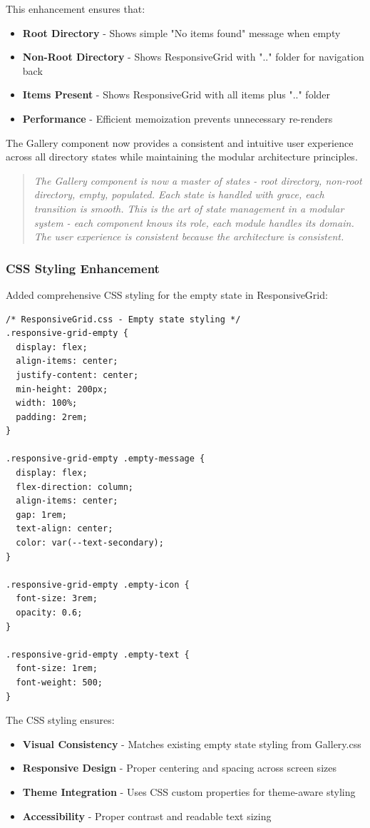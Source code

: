 \documentclass[11pt]{article}
\begin{document}
This enhancement ensures that:
\begin{itemize}
\item \textbf{Root Directory} - Shows simple "No items found" message when empty
\item \textbf{Non-Root Directory} - Shows ResponsiveGrid with ".." folder for navigation back
\item \textbf{Items Present} - Shows ResponsiveGrid with all items plus ".." folder
\item \textbf{Performance} - Efficient memoization prevents unnecessary re-renders
\end{itemize}

The Gallery component now provides a consistent and intuitive user experience across all directory states while maintaining the modular architecture principles.

\begin{quote}
\emph{The Gallery component is now a master of states - root directory, non-root directory, empty, populated. Each state is handled with grace, each transition is smooth. This is the art of state management in a modular system - each component knows its role, each module handles its domain. The user experience is consistent because the architecture is consistent.}
\end{quote}

\subsubsection{CSS Styling Enhancement}

Added comprehensive CSS styling for the empty state in ResponsiveGrid:

\begin{lstlisting}[style=css]
/* ResponsiveGrid.css - Empty state styling */
.responsive-grid-empty {
  display: flex;
  align-items: center;
  justify-content: center;
  min-height: 200px;
  width: 100%;
  padding: 2rem;
}

.responsive-grid-empty .empty-message {
  display: flex;
  flex-direction: column;
  align-items: center;
  gap: 1rem;
  text-align: center;
  color: var(--text-secondary);
}

.responsive-grid-empty .empty-icon {
  font-size: 3rem;
  opacity: 0.6;
}

.responsive-grid-empty .empty-text {
  font-size: 1rem;
  font-weight: 500;
}
\end{lstlisting}

The CSS styling ensures:
\begin{itemize}
\item \textbf{Visual Consistency} - Matches existing empty state styling from Gallery.css
\item \textbf{Responsive Design} - Proper centering and spacing across screen sizes
\item \textbf{Theme Integration} - Uses CSS custom properties for theme-aware styling
\item \textbf{Accessibility} - Proper contrast and readable text sizing
\end{itemize}
\end{document}
